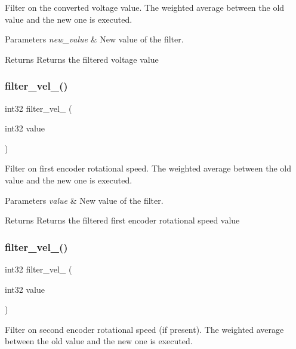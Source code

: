 Filter on the converted voltage value. The weighted average between the old value and the new one is executed.


\begin{DoxyParams}{Parameters}
{\em new\+\_\+value} & New value of the filter.\\
\hline
\end{DoxyParams}
\begin{DoxyReturn}{Returns}
Returns the filtered voltage value 
\end{DoxyReturn}
\mbox{\label{utils_8c_a19d6395ebc48dcac09068a5c6eb19596}} 
\subsubsection{filter\+\_\+vel\+\_()}
{\footnotesize\ttfamily int32 filter\+\_\+vel\+\_ (\begin{DoxyParamCaption}\item[{int32}]{value }\end{DoxyParamCaption})}

Filter on first encoder rotational speed. The weighted average between the old value and the new one is executed.


\begin{DoxyParams}{Parameters}
{\em value} & New value of the filter.\\
\hline
\end{DoxyParams}
\begin{DoxyReturn}{Returns}
Returns the filtered first encoder rotational speed value 
\end{DoxyReturn}
\mbox{\label{utils_8c_aa24da14909e1e213a2d5f5522752f2c9}} 
\subsubsection{filter\+\_\+vel\+\_()}
{\footnotesize\ttfamily int32 filter\+\_\+vel\+\_ (\begin{DoxyParamCaption}\item[{int32}]{value }\end{DoxyParamCaption})}

Filter on second encoder rotational speed (if present). The weighted average between the old value and the new one is executed.


